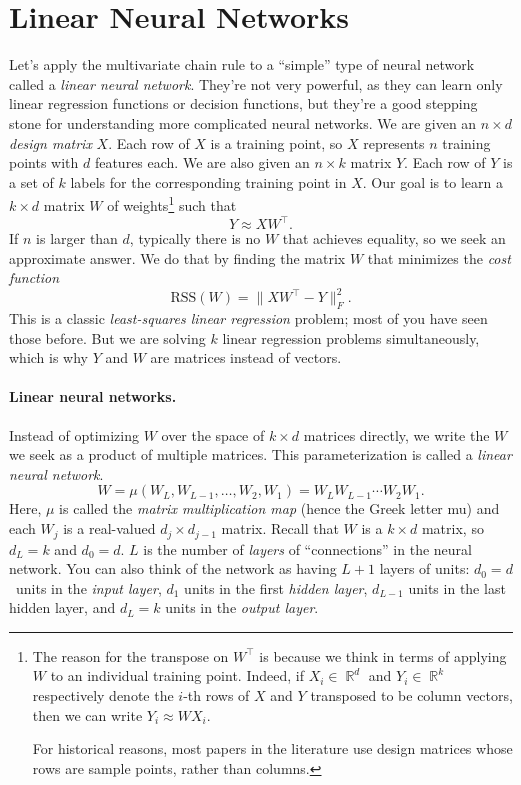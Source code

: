 \documentclass{article}
\newcommand{\Question}[1]{\Large \section{ #1 } \normalsize}
\DeclareMathOperator{\R}{\mathbb{R}}
\begin{document}
\newpage
\Question{Linear Neural Networks}
Let's apply the multivariate chain rule to a ``simple'' type of neural network called a {\em linear neural network}.
They're not very powerful, as they can learn only linear regression functions or decision functions, but they're a good stepping stone for understanding more complicated neural networks.
We are given an $n \times d$ {\em design matrix} $X$.
Each row of $X$ is a training point, so $X$ represents $n$ training points with $d$ features each.
We are also given an $n \times k$ matrix $Y$.
Each row of $Y$ is a set of $k$ labels for the corresponding training point in $X$.
Our goal is to learn a $k \times d$ matrix $W$ of weights\footnote{The reason for the transpose on $W^\top$ is because we think
in terms of applying $W$ to an individual training point.
Indeed, if $X_i \in \R^d$ and $Y_i \in \R^k$
respectively denote the $i$-th rows of $X$ and $Y$ transposed to be column vectors, then 
we can write $Y_i \approx W X_i$.

For historical reasons, most papers in the literature use design matrices
whose rows are sample points, rather than columns.} such that
\[
    Y \approx X W^\top.
\]
If $n$ is larger than $d$, typically there is no $W$ that achieves equality,
so we seek an approximate answer.
We do that by finding the matrix $W$ that minimizes the \textit{cost function}
\begin{equation}
    \mathrm{RSS}(W) = \| X W^\top - Y \|^2_F.
    \label{eq:rss}
\end{equation}
This is a classic {\em least-squares linear regression} problem; most of you have seen those before.
But we are solving $k$ linear regression problems simultaneously, which is why $Y$ and $W$ are matrices instead of vectors.

\paragraph{Linear neural networks.}
Instead of optimizing $W$ over the space of ${k \times d}$ matrices directly, we write the $W$ we seek as a product of multiple matrices.
This parameterization is called a \textit{linear neural network}.
\[
    W = \mu(W_L, W_{L-1}, \ldots, W_2, W_1) = W_L W_{L-1} \cdots W_2 W_1.
\]
Here, $\mu$ is called the {\em matrix multiplication map} (hence the Greek letter mu) and each $W_j$ is a real-valued $d_j \times d_{j-1}$ matrix.
Recall that $W$ is a $k \times d$ matrix, so $d_L = k$ and $d_0 = d$.
$L$ is the number of {\em layers} of ``connections'' in the neural network.
You can also think of the network as having $L + 1$ layers of units:
$d_0 = d$~units in the {\em input layer},
$d_1$ units in the first {\em hidden layer},
$d_{L-1}$ units in the last hidden layer, and
$d_L = k$ units in the {\em output layer}.
\end{document}

